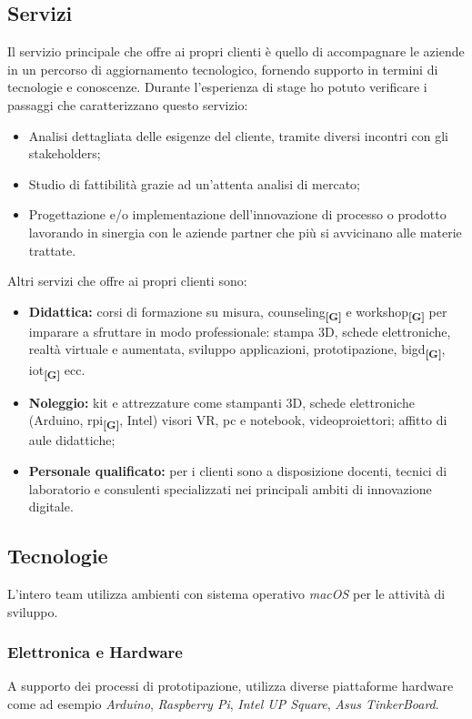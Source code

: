 \subsection{Servizi}
Il servizio principale che \lab{} offre ai propri clienti è quello di accompagnare le aziende in un percorso di aggiornamento tecnologico, fornendo supporto in termini di tecnologie e conoscenze.
Durante l'esperienza di stage ho potuto verificare i passaggi che caratterizzano questo servizio:
\begin{itemize}
\item Analisi dettagliata delle esigenze del cliente, tramite diversi incontri con gli stakeholders;
\item Studio di fattibilità grazie ad un'attenta analisi di mercato;
\item Progettazione e/o implementazione dell'innovazione di processo o prodotto lavorando in sinergia con le aziende partner che più si avvicinano alle materie trattate.
\end{itemize}
Altri servizi che \lab{} offre ai propri clienti sono:
\begin{itemize}
\item \textbf{Didattica:} corsi di formazione su misura, \gls{counseling}\textbf{\textsubscript{[G]}} e \gls{workshop}\textbf{\textsubscript{[G]}} per imparare a sfruttare in modo professionale: stampa 3D, schede elettroniche, realtà virtuale e aumentata, sviluppo applicazioni, prototipazione, \gls{bigd}\textbf{\textsubscript{[G]}}, \gls{iot}\textbf{\textsubscript{[G]}} ecc.
\item \textbf{Noleggio:} kit e attrezzature come stampanti 3D, schede elettroniche (Arduino, \gls{rpi}\textbf{\textsubscript{[G]}}, Intel) visori VR, pc e notebook, videoproiettori; affitto di aule didattiche;
\item \textbf{Personale qualificato:} per i clienti sono a disposizione docenti, tecnici di laboratorio e consulenti specializzati nei principali ambiti di innovazione digitale.
\end{itemize}

\subsection{Tecnologie}
L'intero team utilizza ambienti con sistema operativo \textit{macOS} per le attività di sviluppo. 
\subsubsection{Elettronica e Hardware}
A supporto dei processi di prototipazione, \lab{} utilizza diverse piattaforme hardware come ad esempio \textit{Arduino}, \textit{Raspberry Pi}, \textit{Intel UP Square}, \textit{Asus TinkerBoard}.

